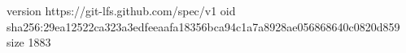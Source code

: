 version https://git-lfs.github.com/spec/v1
oid sha256:29ea12522ca323a3edfeeaafa18356bca94c1a7a8928ae056868640c0820d859
size 1883
